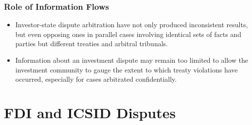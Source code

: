 \documentclass[10pt]{beamer}
\begin{document}
\begin{frame}
\frametitle{Role of Information Flows}

\begin{itemize}
	\item Investor-state dispute arbitration have not only produced inconsistent results, but even opposing ones in parallel cases involving identical sets of facts and parties but different treaties and arbitral tribunals. 
	\item Information about an investment dispute may remain too limited to allow the investment community to gauge the extent to which treaty violations have occurred, especially for cases arbitrated confidentially. 
\end{itemize}

\end{frame}

\section{FDI and ICSID Disputes}

\end{document}
